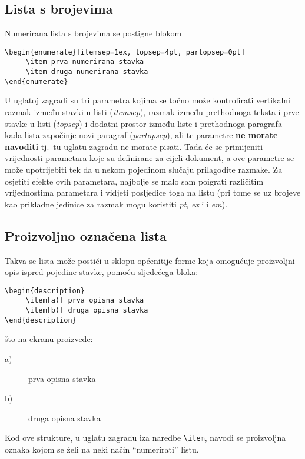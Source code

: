 \subsection{Lista s brojevima}
Numerirana lista s brojevima se postigne blokom
\begin{verbatim}
\begin{enumerate}[itemsep=1ex, topsep=4pt, partopsep=0pt]
     \item prva numerirana stavka
     \item druga numerirana stavka
\end{enumerate}
\end{verbatim}
U uglatoj zagradi su tri parametra kojima se točno može kontrolirati vertikalni razmak između stavki u listi (\emph{itemsep}), razmak između prethodnoga teksta i prve stavke u listi (\emph{topsep}) i dodatni prostor između liste i prethodnoga paragrafa kada lista započinje novi paragraf (\emph{partopsep}), ali te parametre \textbf{ne morate navoditi} tj.\ tu uglatu zagradu ne morate pisati. Tada će se primijeniti vrijednosti parametara koje su definirane za cijeli dokument, a ove parametre se može upotrijebiti tek da u nekom pojedinom slučaju prilagodite razmake.
Za osjetiti efekte ovih parametara, najbolje se malo sam poigrati različitim vrijednostima parametara i vidjeti posljedice toga na listu (pri tome se uz brojeve kao prikladne jedinice za razmak mogu koristiti \emph{pt}, \emph{ex} ili \emph{em}).

\subsection{Proizvoljno označena lista}
Takva se lista može postići u sklopu općenitije forme koja omogućuje proizvoljni opis ispred pojedine stavke, pomoću sljedećega bloka:
\begin{verbatim}
\begin{description}
     \item[a)] prva opisna stavka
     \item[b)] druga opisna stavka
\end{description}
\end{verbatim}
što na ekranu proizvede:
\begin{description}%
	\item[a)] prva opisna stavka
	\item[b)] druga opisna stavka \\
\end{description}
%
Kod ove strukture, u uglatu zagradu iza naredbe \verb|\item|, navodi se proizvoljna oznaka kojom se želi na neki način ``numerirati'' listu.
